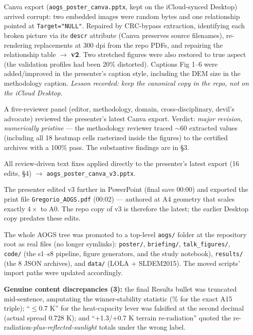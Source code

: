 \documentclass[11pt]{article}
\newcommand{\shead}[1]{\medskip\noindent{\color{teal}\large\bfseries #1}\par\nobreak\smallskip}
\begin{document}
\begin{description}[leftmargin=1.5em]
    Canva export (\texttt{aogs\_poster\_canva.pptx}, kept on the
    iCloud-synced Desktop) arrived corrupt: two embedded images were
    random bytes and one relationship pointed at \texttt{Target="NULL"}.
    Repaired by CRC-bypass extraction, identifying each broken picture via
    its \texttt{descr} attribute (Canva preserves source filenames),
    re-rendering replacements at 300 dpi from the repo PDFs, and repairing
    the relationship table $\to$ \textbf{v2}. Two stretched figures were
    also restored to true aspect (the validation profiles had been 20\%
    distorted). Captions Fig 1--6 were added/improved in the presenter's
    caption style, including the DEM size in the methodology caption.
    \emph{Lesson recorded: keep the canonical copy in the repo, not on the
    iCloud Desktop.}
  \item[Simulated peer review (07-12).] A five-reviewer panel (editor,
    methodology, domain, cross-disciplinary, devil's advocate) reviewed the
    presenter's latest Canva export. Verdict: \emph{major revision,
    numerically pristine} --- the methodology reviewer traced $\sim$60
    extracted values (including all 18 heatmap cells rasterized inside the
    figures) to the certified archives with a 100\% pass. The substantive
    findings are in \S3.
  \item[v3 (07-12/13).] All review-driven text fixes applied directly to
    the presenter's latest export (16 edits, \S4) $\to$
    \texttt{aogs\_poster\_canva\_v3.pptx}.
  \item[Presenter finalization (07-13).] The presenter edited v3 further in
    PowerPoint (final save 00:00) and exported the print file
    \texttt{Gregorio\_AOGS.pdf} (00:02) --- authored at A4 geometry that
    scales exactly $4\times$ to A0. The repo copy of v3 is therefore the
    latest; the earlier Desktop copy predates these edits.
  \item[Repo reorganization (07-13/14).] The whole AOGS tree was promoted
    to a top-level \texttt{aogs/} folder at the repository root as real
    files (no longer symlinks): \texttt{poster/}, \texttt{briefing/},
    \texttt{talk\_figures/}, \texttt{code/} (the s1--s8 pipeline, figure
    generators, and the study notebook), \texttt{results/} (the 8 JSON
    archives), and \texttt{data/} (LOLA + SLDEM2015). The moved scripts'
    import paths were updated accordingly.
\end{description}

\shead{3\enspace What the review found (the substance)}
\textbf{Genuine content discrepancies (3):} the final Results bullet was
truncated mid-sentence, amputating the winner-stability statistic
(\stabcKAfif\% for the exact A15 triple); ``$\le$0.7 K'' for the
heat-capacity lever was falsified at the second decimal (actual spread
0.728 K); and ``+1.3/+0.7 K terrain re-radiation'' quoted the
re-radiation-\emph{plus-reflected-sunlight} totals under the wrong label.
\end{document}
